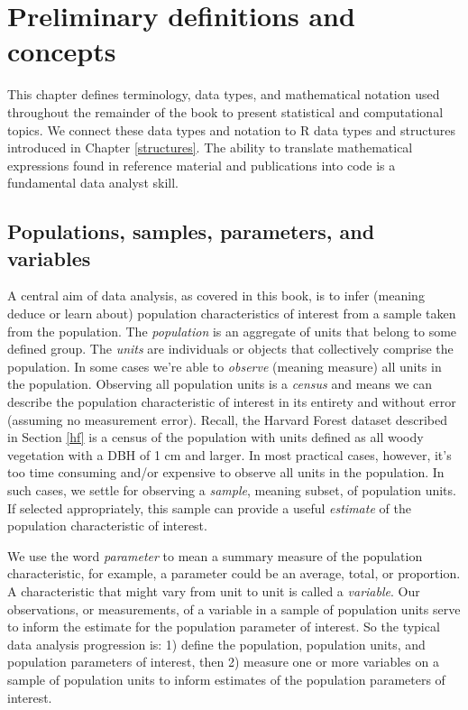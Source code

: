 \documentclass[
  11pt,
]{krantz}
\theoremstyle{definition}
\theoremstyle{definition}
\theoremstyle{definition}
\theoremstyle{definition}
\theoremstyle{remark}
\begin{document}
\hypertarget{notation}{%
\chapter{Preliminary definitions and concepts}\label{notation}}

This chapter defines terminology, data types, and mathematical notation used throughout the remainder of the book to present statistical and computational topics. We connect these data types and notation to R data types and structures introduced in Chapter \ref{structures}. The ability to translate mathematical expressions found in reference material and publications into code is a fundamental data analyst skill.

\hypertarget{popSamps}{%
\section{Populations, samples, parameters, and variables}\label{popSamps}}

A central aim of data analysis, as covered in this book, is to infer (meaning deduce or learn about) population characteristics of interest from a sample taken from the population. The \emph{population} is an aggregate of units that belong to some defined group. The \emph{units} are individuals or objects that collectively comprise the population. In some cases we're able to \emph{observe} (meaning measure) all units in the population. Observing all population units is a \emph{census} and means we can describe the population characteristic of interest in its entirety and without error (assuming no measurement error). Recall, the Harvard Forest dataset described in Section \ref{hf} is a census of the population with units defined as all woody vegetation with a DBH of 1 cm and larger. In most practical cases, however, it's too time consuming and/or expensive to observe all units in the population. In such cases, we settle for observing a \emph{sample}, meaning subset, of population units. If selected appropriately, this sample can provide a useful \emph{estimate} of the population characteristic of interest.

We use the word \emph{parameter} to mean a summary measure of the population characteristic, for example, a parameter could be an average, total, or proportion. A characteristic that might vary from unit to unit is called a \emph{variable}. Our observations, or measurements, of a variable in a sample of population units serve to inform the estimate for the population parameter of interest. So the typical data analysis progression is: 1) define the population, population units, and population parameters of interest, then 2) measure one or more variables on a sample of population units to inform estimates of the population parameters of interest.
\end{document}

